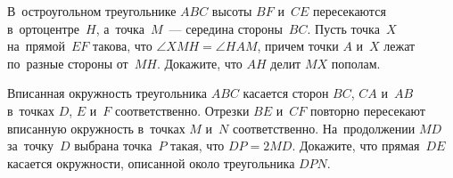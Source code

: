 \begin{problems}
\item
В~остроугольном треугольнике $ABC$ высоты $BF$ и~$CE$ пересекаются
в~ортоцентре~$H$, а~точка~$M$~--- середина стороны~$BC$.
Пусть точка~$X$ на~прямой~$EF$ такова, что $\angle XMH = \angle HAM$, причем
точки $A$ и~$X$ лежат по~разные стороны от~$MH$.
Докажите, что $AH$ делит $MX$ пополам.

\item
Вписанная окружность треугольника $ABC$ касается сторон $BC$, $CA$ и~$AB$
в~точках $D$, $E$ и~$F$ соответственно.
Отрезки $BE$ и~$CF$ повторно пересекают вписанную окружность в~точках $M$ и~$N$
соответственно.
На~продолжении $MD$ за~точку~$D$ выбрана точка~$P$ такая, что $DP = 2 MD$.
Докажите, что прямая~$DE$ касается окружности, описанной около треугольника
$DPN$.

\end{problems}

